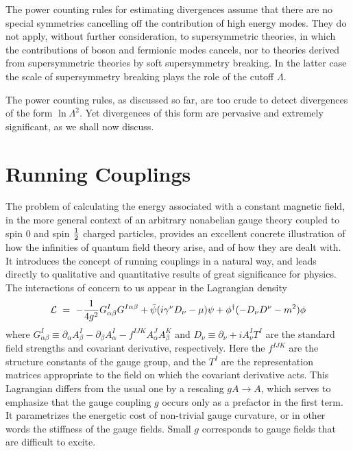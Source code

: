 \documentclass[aps,epsf]{revtex4}
\begin{document}
The power counting
rules for estimating divergences assume that there are no special
symmetries cancelling off the contribution of high energy modes.  They
do not apply, without further consideration, to supersymmetric
theories, in which the contributions of boson and fermionic modes
cancels, nor to theories derived from supersymmetric theories by soft
supersymmetry breaking.  In the latter case the scale of supersymmetry
breaking plays the role of the cutoff $\Lambda$. 

The power counting
rules, as discussed so far, are too crude to detect divergences of the
form $\ln \Lambda^2$.  Yet divergences of this form are pervasive and
extremely significant, as we shall now discuss.




\section{Running Couplings }


The problem of calculating the energy associated with a constant
magnetic field, in the more general context of an arbitrary nonabelian
gauge theory coupled to spin 0 and spin ${1\over 2}$ charged
particles, provides an excellent concrete illustration of how the
infinities of quantum field theory arise, and of how they are dealt
with.  It introduces the concept of running couplings in a natural
way, and leads directly to qualitative and quantitative results of
great significance for physics. The interactions of concern to us
appear in the Lagrangian density
\begin{equation}{\cal L} ~=~ -{1\over 4g^2} G^I_{\alpha \beta}
G^{I\alpha\beta} + \bar \psi (i\gamma^\nu D_\nu - \mu ) \psi
+\phi^\dagger(-D_\nu D^\nu - m^2 ) \phi
\label{eq:lagr}
\end{equation}
where $G^I_{\alpha \beta} \equiv
\partial_\alpha A^I_\beta - \partial_\beta A^I_\alpha -f^{IJK}
A^J_\alpha A^K_\beta $ and $D_\nu \equiv \partial_\nu + i A^I_\nu T^I$
are the standard field strengths and covariant derivative,
respectively.  Here the $f^{IJK}$ are the structure constants of the
gauge group, and the $T^I$ are the representation matrices appropriate
to the field on which the covariant derivative acts.  This Lagrangian
differs from the usual one by a rescaling $gA \rightarrow A$, which
serves to emphasize that the gauge coupling $g$ occurs only as a
prefactor in the first term. It parametrizes the energetic cost of
non-trivial gauge curvature, or in other words the stiffness of the
gauge fields.  Small $g$ corresponds to gauge fields that are
difficult to excite.  
\end{document}
